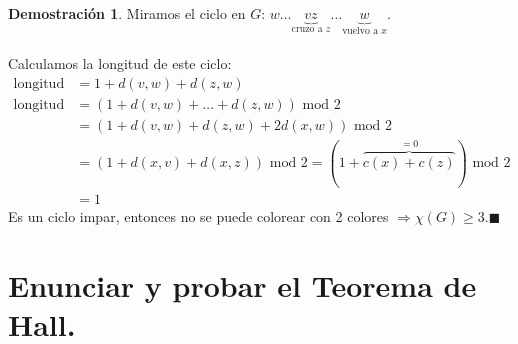 \documentclass[11pt, a4paper]{article}
\theoremstyle{definition}
\newtheorem*{demostracion}{Demostración}
\begin{document}
\begin{demostracion}
    Miramos el ciclo en $G$: $w \ldots \underset{\text{cruzo a }z}{\underbrace{vz}} \ldots \underset{\text{vuelvo a }x}{\underbrace{w}}$.\\ \\
    Calculamos la longitud de este ciclo:
    \begin{align*}
    \text{longitud} &= 1 + d(v, w) + d(z, w) \\
    \text{longitud mod 2} &= (1 + d(v, w) + \ldots + d(z, w)) \text{ mod } 2 \\
    &= (1 + d(v, w) + d(z, w) + 2d(x, w)) \text{ mod } 2 \\
    &= (1 + d(x, v) + d(x, z)) \text{ mod } 2 = (1 + \overbrace{c(x) + c(z)}^{=0}) \text{ mod } 2 \\
    &= 1
    \end{align*}
    Es un ciclo impar, entonces no se puede colorear con 2 colores $\Rightarrow \chi(G)\geq 3. \blacksquare$
\end{demostracion}

\section{Enunciar y probar el Teorema de Hall.}
\end{document}
